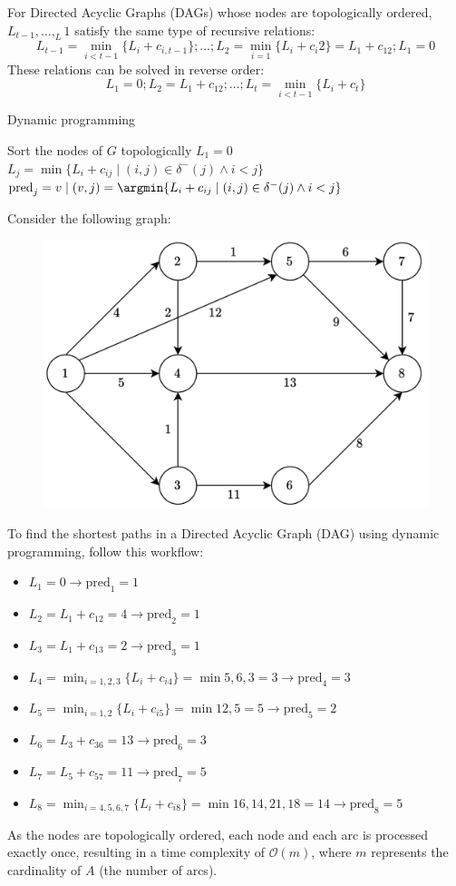 For Directed Acyclic Graphs (DAGs) whose nodes are topologically ordered, $L_{t-1},\dots,_L1$ satisfy the same type of recursive relations:
\[L_{t-1}=\min_{i<t-1}\{L_i+c_{i,t-1}\};\dots;L_2=\min_{i=1}\{L_i+c_i2\}=L_1+c_{12};L_1=0\]
These relations can be solved in reverse order:
\[L_1=0;L_2=L_1+c_{12};\dots;L_{t}=\min_{i<t-1}\{L_i+c_{t}\}\]
\begin{algorithm}[H]
    \caption{Dynamic programming}
        \begin{algorithmic}[1]
            \State Sort the nodes of $G$ topologically
            \State $L_1 = 0$
                \State $L_j = \min\{L_i+c_{ij}\mid(i,j) \in \delta^{-}(j) \land i < j\}$
                \State $\text{pred}_j = v \mid (v,j)=\argmin \{L_i+c_{ij}\mid (i,j) \in \delta^{-}(j) \land i < j\}$
            \EndFor
        \end{algorithmic}
\end{algorithm}
\begin{example}
    Consider the following graph:
    \begin{figure}[H]
        \centering
        \includegraphics[width=0.4\linewidth]{images/DAG.png}
    \end{figure}
    To find the shortest paths in a Directed Acyclic Graph (DAG) using dynamic programming, follow this workflow:
    \begin{itemize}
        \item $L_1=0 \rightarrow \text{pred}_1=1$
        \item $L_2=L_1+c_{12}=4 \rightarrow \text{pred}_2=1$
        \item $L_3=L_1+c_{13}=2 \rightarrow \text{pred}_3=1$
        \item $L_4=\min_{i=1,2,3}\{L_i+c_{i4}\}=\min{5,6,3}=3 \rightarrow \text{pred}_4=3$
        \item $L_5=\min_{i=1,2}\{L_i+c_{i5}\}=\min{12,5}=5 \rightarrow \text{pred}_5=2$
        \item $L_6=L_3+c_{36}=13 \rightarrow \text{pred}_6=3$
        \item $L_7=L_5+c_{57}=11 \rightarrow \text{pred}_7=5$
        \item $L_8=\min_{i=4,5,6,7}\{L_i+c_{i8}\}=\min{16,14,21,18}=14 \rightarrow \text{pred}_8=5$
    \end{itemize}
\end{example}
As the nodes are topologically ordered, each node and each arc is processed exactly once, resulting in a time complexity of $\mathcal{O}(m)$, where $m$ represents the cardinality of $A$ (the number of arcs).    

